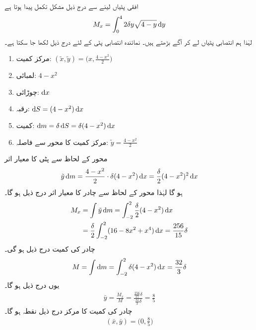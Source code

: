 افقی پٹیاں لینے سے  درج ذیل مشکل تکمل پیدا ہوتا ہے
\begin{align*}
M_x=\int_0^42\delta y\sqrt{4-y}\dif y
\end{align*} 
لہٰذا ہم انتصابی پٹیاں لے کر آگے بڑھتے ہیں۔ نمائندہ انتصابی پٹی کے لئے درج ذیل لکھا جا سکتا ہے۔
\begin{multicols}{2}
\begin{enumerate}[]
\item
مرکز کمیت:\quad
$(\tilde{x},\tilde{y})=\big(x,\frac{4-x^2}{2}\big)$
\item
لمبائی:\quad
$4-x^2$
\item
چوڑائی:\quad
$\dif x$
\item
رقبہ:\quad
$\dif S=(4-x^2)\dif x$
\item
کمیت:\quad
$\dif m=\delta \dif S=\delta(4-x^2)\dif x$
\item
مرکز کمیت کا محور  سے فاصلہ:\quad
$\tilde{y}=\frac{4-x^2}{2}$
\end{enumerate}
\end{multicols}
محور  کے لحاظ سے پٹی کا معیار اثر
\begin{align*}
\tilde{y}\dif m=\frac{4-x^2}{2}\cdot \delta(4-x^2)\dif x=\frac{\delta}{2}(4-x^2)^2\dif x
\end{align*}
ہو گا لہٰذا محور  کے لحاظ سے چادر کا معیار اثر درج ذیل ہو گا۔
\begin{align}\label{مساوات_تکمل_استعمال_محور_ایکس_لحاظ_معیار_اثر}
M_x&=\int \tilde{y}\dif m=\int_{-2}^2\frac{\delta}{2}(4-x^2)\dif x\\
&=\frac{\delta}{2}\int_{-2}^2(16-8x^2+x^4)\dif x=\frac{256}{15}\delta
\end{align}
چادر کی کمیت درج ذیل ہو گی۔
\begin{align}\label{مساوات_تکمل_استعمال_محور_کمیت_چادر}
M=\int \dif m=\int_{-2}^2\delta(4-x^2)\dif x=\frac{32}{3}\delta
\end{align}
یوں درج ذیل ہو گا۔
\begin{align*}
\bar{y}=\frac{M_x}{M}=\frac{\frac{256}{15}\delta}{\frac{32}{3}\delta}=\frac{8}{5}
\end{align*}
چادر کی کمیت کا مرکز درج ذیل نقطہ ہو گا۔
\begin{align*}
(\bar{x},\bar{y})=\big(0,\frac{8}{5}\big)
\end{align*}
